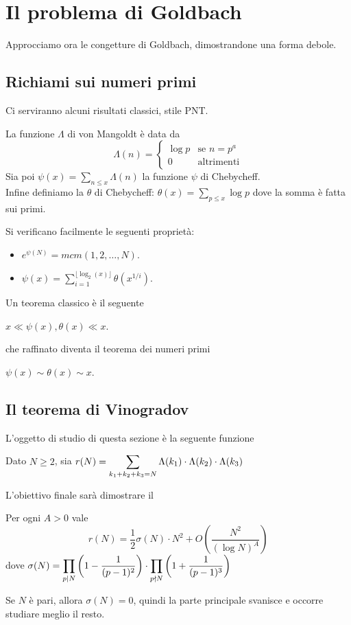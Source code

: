 \chapter{Il problema di Goldbach}
Approcciamo ora le congetture di Goldbach, dimostrandone una forma debole.

\section{Richiami sui numeri primi}
Ci serviranno alcuni risultati classici, stile PNT.

\begin{definition}
    La funzione $\Lambda$ di von Mangoldt è data da $$\Lambda(n)=\begin{cases}
    \log p & \text{se } n=p^a \\
    0 & \text{altrimenti}
    \end{cases}$$
    Sia poi $\psi(x)=\sum_{n\le x}\Lambda(n)$ la funzione $\psi$ di Chebycheff.\\
    Infine definiamo la $\theta$ di Chebycheff: $\theta(x)=\sum_{p\le x}\log p$ dove la somma è fatta sui primi.
\end{definition}
\begin{proposition}
    Si verificano facilmente le seguenti proprietà:
    \begin{itemize}
        \item $e^{\psi(N)}=mcm(1,2,\dots,N)$.
        \item $\psi(x)=\sum_{i=1}^{\lfloor\log_2(x)\rfloor}\theta(x^{1/i})$.
    \end{itemize}
\end{proposition}

Un teorema classico è il seguente
\begin{theorem}
    $x \ll \psi(x), \theta(x) \ll x$.
\end{theorem}
che raffinato diventa il teorema dei numeri primi
\begin{theorem}[PNT]\label{pnt}
    $\psi(x)\sim \theta(x) \sim x$.
\end{theorem}

\section{Il teorema di Vinogradov}
L'oggetto di studio di questa sezione è la seguente funzione
\begin{definition}
    Dato $N\ge2$, sia $\displaystyle r(N)=\sum_{k_1+k_2+k_3=N}\Lambda(k_1)\cdot\Lambda(k_2)\cdot\Lambda(k_3)$
\end{definition}
L'obiettivo finale sarà dimostrare il
\begin{theorem}[Vinogradov, 1930]Per ogni $A>0$ vale
    $$ r(N)=\frac12\sigma(N)\cdot N^2+O\left( \frac{N^2}{(\log N)^A} \right) $$
    dove $\displaystyle\sigma(N)= \prod_{p\mid N}\left( 1-\frac{1}{(p-1)^2} \right) \cdot \prod_{p\nmid N}\left( 1+\frac{1}{(p-1)^3} \right)$
\end{theorem}
\begin{oss}
    Se $N$ è pari, allora $\sigma(N)=0$, quindi la parte principale svanisce e occorre studiare meglio il resto.
\end{oss}

